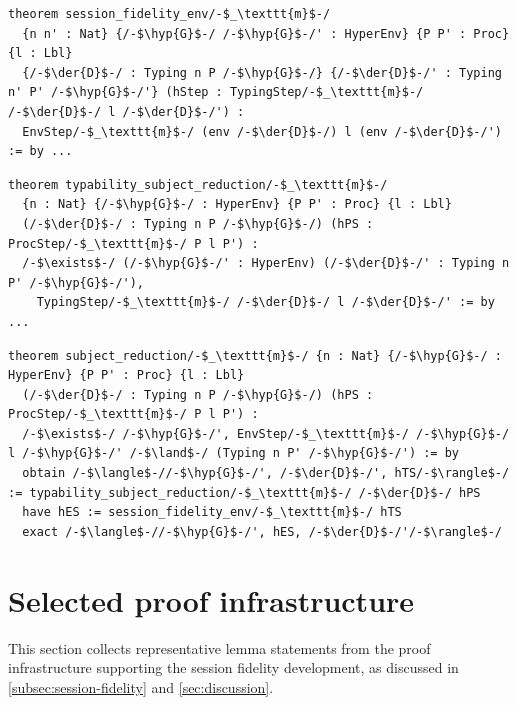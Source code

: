 \begin{lstlisting}[language=Lean4,
  caption={Environment erasure simulation: typed derivation steps project to environment steps.},
  label={lst:app-sf-env}]
theorem session_fidelity_env/-$_\texttt{m}$-/
  {n n' : Nat} {/-$\hyp{G}$-/ /-$\hyp{G}$-/' : HyperEnv} {P P' : Proc} {l : Lbl}
  {/-$\der{D}$-/ : Typing n P /-$\hyp{G}$-/} {/-$\der{D}$-/' : Typing n' P' /-$\hyp{G}$-/'} (hStep : TypingStep/-$_\texttt{m}$-/ /-$\der{D}$-/ l /-$\der{D}$-/') :
  EnvStep/-$_\texttt{m}$-/ (env /-$\der{D}$-/) l (env /-$\der{D}$-/') := by ...
\end{lstlisting}

\begin{lstlisting}[language=Lean4,
  caption={Target statement for typability subject reduction. The remaining incomplete proof case is \texttt{res}},
  label={lst:app-typability}]
theorem typability_subject_reduction/-$_\texttt{m}$-/
  {n : Nat} {/-$\hyp{G}$-/ : HyperEnv} {P P' : Proc} {l : Lbl}
  (/-$\der{D}$-/ : Typing n P /-$\hyp{G}$-/) (hPS : ProcStep/-$_\texttt{m}$-/ P l P') :
  /-$\exists$-/ (/-$\hyp{G}$-/' : HyperEnv) (/-$\der{D}$-/' : Typing n P' /-$\hyp{G}$-/'),
    TypingStep/-$_\texttt{m}$-/ /-$\der{D}$-/ l /-$\der{D}$-/' := by ...
\end{lstlisting}

\begin{lstlisting}[language=Lean4,
  caption={Target statement for subject reduction for the multiplicative fragment, conditional on completion of typability subject reduction.},
  label={lst:app-sr}]
theorem subject_reduction/-$_\texttt{m}$-/ {n : Nat} {/-$\hyp{G}$-/ : HyperEnv} {P P' : Proc} {l : Lbl}
  (/-$\der{D}$-/ : Typing n P /-$\hyp{G}$-/) (hPS : ProcStep/-$_\texttt{m}$-/ P l P') :
  /-$\exists$-/ /-$\hyp{G}$-/', EnvStep/-$_\texttt{m}$-/ /-$\hyp{G}$-/ l /-$\hyp{G}$-/' /-$\land$-/ (Typing n P' /-$\hyp{G}$-/') := by
  obtain /-$\langle$-//-$\hyp{G}$-/', /-$\der{D}$-/', hTS/-$\rangle$-/ := typability_subject_reduction/-$_\texttt{m}$-/ /-$\der{D}$-/ hPS
  have hES := session_fidelity_env/-$_\texttt{m}$-/ hTS
  exact /-$\langle$-//-$\hyp{G}$-/', hES, /-$\der{D}$-/'/-$\rangle$-/
\end{lstlisting}

\section{Selected proof infrastructure}\label{app:proof-infrastructure}
This section collects representative lemma statements from the proof infrastructure supporting the session fidelity development, as discussed in \cref{subsec:session-fidelity} and \cref{sec:discussion}.

